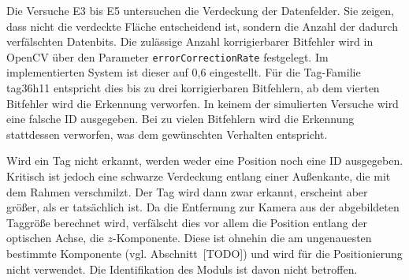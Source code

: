 Die Versuche E3 bis E5 untersuchen die Verdeckung der Datenfelder. Sie zeigen, dass nicht die verdeckte Fläche entscheidend ist, sondern die Anzahl der dadurch verfälschten Datenbits. Die zulässige Anzahl korrigierbarer Bitfehler wird in OpenCV über den Parameter \texttt{errorCorrectionRate} festgelegt. Im implementierten System ist dieser auf 0,6 eingestellt. Für die Tag-Familie tag36h11 entspricht dies bis zu drei korrigierbaren Bitfehlern, ab dem vierten Bitfehler wird die Erkennung verworfen. %
In keinem der simulierten Versuche wird eine falsche ID ausgegeben. Bei zu vielen Bitfehlern wird die Erkennung stattdessen verworfen, was dem gewünschten Verhalten entspricht.

Wird ein Tag nicht erkannt, werden weder eine Position noch eine ID ausgegeben. Kritisch ist jedoch eine schwarze Verdeckung entlang einer Außenkante, die mit dem Rahmen verschmilzt. Der Tag wird dann zwar erkannt, erscheint aber größer, als er tatsächlich ist. Da die Entfernung zur Kamera aus der abgebildeten Taggröße berechnet wird, verfälscht dies vor allem die Position entlang der optischen Achse, die $z$-Komponente. Diese ist ohnehin die am ungenauesten bestimmte Komponente (vgl. Abschnitt~[TODO]) und wird für die Positionierung nicht verwendet. Die Identifikation des Moduls ist davon nicht betroffen.


